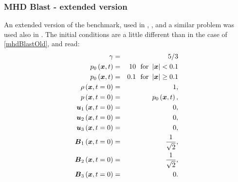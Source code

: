 \subsubsection{MHD Blast - extended version}
\label{sec:blast}
An extended version of the benchmark, used in \cite{blastNew1}, \cite{athenaBlast}, and a similar problem was used also in \cite{blastNew2}. The initial conditions are a little different than in the case of \ref{mhdBlastOld}, and read:
\begin{eqnarray}
\label{mhdBlastNew}
\gamma & = & 5 / 3\\ \nonumber
p_0\left(\mbox{\boldmath $x$}, t\right) & = & 10\ \ \text{for}\ \left|\mbox{\boldmath $x$}\right| < 0.1\\ \nonumber
p_0\left(\mbox{\boldmath $x$}, t\right) & = & 0.1\ \ \text{for}\ \left|\mbox{\boldmath $x$}\right| \geq 0.1\\ \nonumber
\rho\left(\mbox{\boldmath $x$}, t = 0\right) & = & 1,\\ \nonumber
p\left(\mbox{\boldmath $x$}, t = 0\right) & = & p_0\left(\mbox{\boldmath $x$}, t\right),\\ \nonumber
\mbox{\boldmath $u$}_1\left(\mbox{\boldmath $x$}, t = 0\right) & = & 0,\\ \nonumber
\mbox{\boldmath $u$}_2\left(\mbox{\boldmath $x$}, t = 0\right) & = & 0,\\ \nonumber
\mbox{\boldmath $u$}_3\left(\mbox{\boldmath $x$}, t = 0\right) & = & 0,\\ \nonumber
\mbox{\boldmath $B$}_1\left(\mbox{\boldmath $x$}, t = 0\right) & = & \frac{1}{\sqrt{2}},\\ \nonumber
\mbox{\boldmath $B$}_2\left(\mbox{\boldmath $x$}, t = 0\right) & = & \frac{1}{\sqrt{2}},\\ \nonumber
\mbox{\boldmath $B$}_3\left(\mbox{\boldmath $x$}, t = 0\right) & = & 0.
\end{eqnarray}



